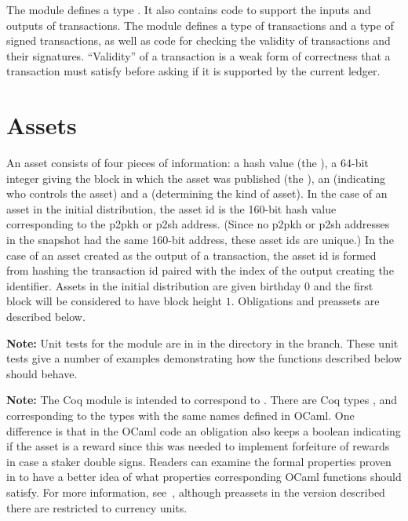 The module  defines a type {}.
It also contains code to support the inputs and outputs of transactions.
The module  defines a type {} of transactions
and a type {} of signed transactions,
as well as code for checking the validity of transactions
and their signatures.
``Validity'' of a transaction is a weak form of correctness
that a transaction must satisfy before asking if it is supported by the current ledger.

\section{Assets}

An asset consists of four pieces of information:
a hash value (the {}),
a 64-bit integer giving the block in which the asset was published (the {}),
an {} (indicating who controls the asset)
and a {} (determining the kind of asset).
In the case of an asset in the initial distribution,
the asset id is the 160-bit hash value corresponding to the p2pkh or p2sh address.
(Since no p2pkh or p2sh addresses in the snapshot had the same 160-bit address,
these asset ids are unique.)
In the case of an asset created as the output of a transaction,
the asset id is formed from hashing the transaction id paired with the index of the output
creating the identifier.
Assets in the initial distribution are given birthday $0$
and the first block will be considered to have block height $1$.
Obligations and preassets are described below.

{\bf{Note:}} Unit tests for the {} module are in {}
in the {}
directory in the {} branch.
These unit tests give a number of examples demonstrating how the functions described below should behave.

{\bf{Note:}} The Coq module {} is intended to correspond to {}.
There are Coq types {}, {} and {}
corresponding to the types with the same names defined in OCaml.
One difference is that in the OCaml code an obligation also keeps a boolean indicating if the
asset is a reward since this was needed to implement forfeiture of rewards in case a staker
double signs.
Readers can examine the formal properties proven in {} to have a better
idea of what properties corresponding OCaml functions should satisfy.
For more information, see~\cite{White2015b}, although preassets in the version described there are restricted to currency units.

